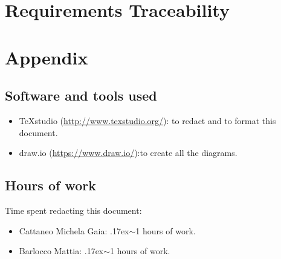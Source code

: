 \documentclass[18pt,oneside,a4paper, titlepage]{article}
\begin{document}
	\section{Requirements Traceability}
\newpage
	\section{Appendix}
		\subsection{Software and tools used}
				\begin{itemize}
					\item TeXstudio (\url{http://www.texstudio.org/}): to redact and to format this document.
					\item draw.io (\url{https://www.draw.io/}):to create all the diagrams.
				\end{itemize}
		\subsection{Hours of work}
			Time spent redacting this document:
			\begin{itemize}
				\item Cattaneo Michela Gaia: {\raise.17ex\hbox{$\scriptstyle\sim$}}1 hours of work.
				\item Barlocco Mattia: {\raise.17ex\hbox{$\scriptstyle\sim$}}1 hours of work.
			\end{itemize}
		
		
		
\end{document}
